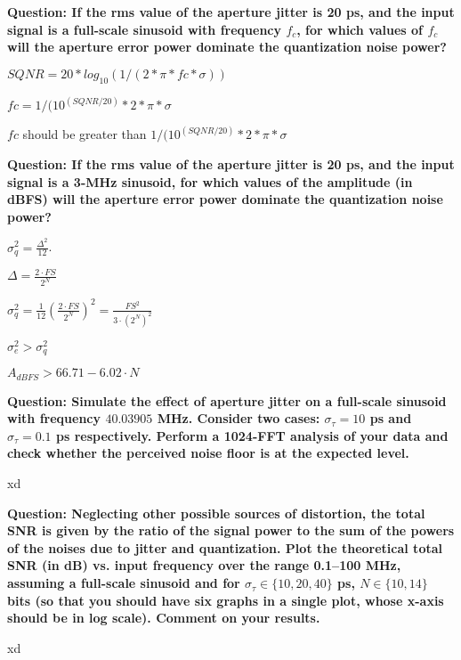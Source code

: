 \textbf{Question: If the rms value of the aperture jitter is 20 ps, and the input signal is a full-scale sinusoid with frequency $f_c$,
    for which values of $f_c$ will the aperture error power dominate the quantization noise power?
}
\vspace{0.5cm}

$SQNR = 20 * log_{10}(1 / (2*\pi*fc*\sigma))$

$fc = 1 / ( 10^(SQNR / 20) * 2*\pi*\sigma $

$fc$ should be greater than $1 / ( 10^(SQNR / 20) * 2*\pi*\sigma $

\vspace{1cm}
\textbf{Question: If the rms value of the aperture jitter is 20 ps, and the input signal is a 3-MHz sinusoid, for which values of the amplitude
    (in dBFS) will the aperture error power dominate the quantization noise power?
}
\vspace{0.5cm}

$\sigma_{q}^{2}=\frac{\Delta^{2}}{12}$.

$\Delta=\frac{2\cdot FS}{2^{N}}$

$\sigma_{q}^{2} = \frac{1}{12} \left( \frac{2 \cdot FS}{2^N} \right)^2 = \frac{FS^2}{3 \cdot (2^N)^2}$

$\sigma_e^2 > \sigma_q^2$

$A_{dBFS} > 66.71 - 6.02 \cdot N$


\vspace{1cm}
\textbf{Question: Simulate the effect of aperture jitter on a full-scale sinusoid with frequency $40.03905$ MHz.
    Consider two cases: $\sigma_\tau = 10$ ps and $\sigma_\tau=0.1$ ps respectively.
    Perform a 1024-FFT analysis of your data and check whether the perceived noise floor is at the expected level.
}
\vspace{0.5cm}

xd

\vspace{1cm}
\textbf{Question: Neglecting other possible sources of distortion, the total SNR is given by the ratio of the signal power to the sum of the powers of the noises due to jitter and quantization. Plot the theoretical total SNR (in dB) vs. input frequency over the range 0.1--100 MHz, assuming a full-scale sinusoid and for $\sigma_\tau \in \{10,20,40\}$ ps, $N\in \{10, 14\}$ bits (so that you should have six graphs in a single plot, whose x-axis should be in log scale). Comment on your results.
}
\vspace{0.5cm}

xd
